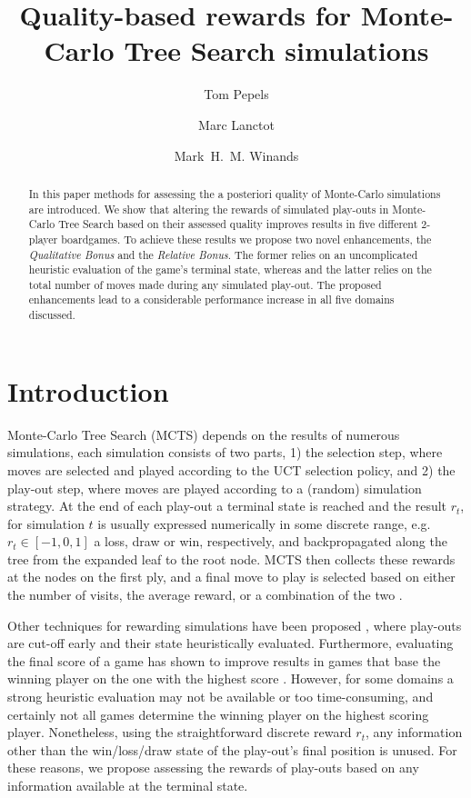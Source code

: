 \documentclass{ecai2010}
\begin{document}
\title{Quality-based rewards for Monte-Carlo Tree Search simulations}

\author{Tom Pepels \and Marc Lanctot \and Mark~H.~M. Winands  }

\maketitle


\begin{abstract}
In this paper methods for assessing the a posteriori quality of Monte-Carlo simulations are introduced. We show that altering the rewards of simulated play-outs in Monte-Carlo Tree Search based on their assessed quality improves results in five different 2-player boardgames. To achieve these results we propose two novel enhancements, the \emph{Qualitative Bonus} and the \emph{Relative Bonus}. The former relies on an uncomplicated heuristic evaluation of the game's terminal state, whereas and the latter relies on the total number of moves made during any simulated play-out. The proposed enhancements lead to a considerable performance increase in all five domains discussed.
\end{abstract}

\section{Introduction}
\label{sec:intro}
Monte-Carlo Tree Search (MCTS) depends on the results of numerous simulations, each simulation consists of two parts, 1) the selection step, where moves are selected and played according to the UCT selection policy, and 2) the play-out step, where moves are played according to a (random) simulation strategy. At the end of each play-out a terminal state is reached and the result $r_t$, for simulation $t$ is usually expressed numerically in some discrete range, e.g. $r_t \in [-1, 0, 1]$ a loss, draw or win, respectively, and backpropagated along the tree from the expanded leaf to the root node. MCTS then collects these rewards at the nodes on the first ply, and a final move to play is selected based on either the number of visits, the average reward, or a combination of the two \cite{chaslot2008progressive}.

Other techniques for rewarding simulations have been proposed \cite{Winands2010a}, where play-outs are cut-off early and their state heuristically evaluated. Furthermore, evaluating the final score of a game has shown to improve results in games that base the winning player on the one with the highest score \cite{shibahara2008combining}. However, for some domains a strong heuristic evaluation may not be available or too time-consuming, and certainly not all games determine the winning player on the highest scoring player. Nonetheless, using the straightforward discrete reward $r_t$, any information other than the win/loss/draw state of the play-out's final position is unused. For these reasons, we propose assessing the rewards of play-outs based on any information available at the terminal state.
\end{document}
